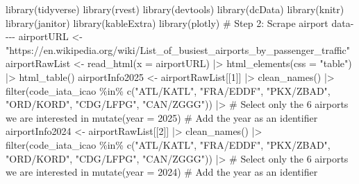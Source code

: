 \documentclass[
  letterpaper,
  DIV=11,
  numbers=noendperiod]{scrartcl}
\newenvironment{Shaded}{\begin{snugshade}}{\end{snugshade}}
\newcommand{\AttributeTok}[1]{\textcolor[rgb]{0.40,0.45,0.13}{#1}}
\newcommand{\CommentTok}[1]{\textcolor[rgb]{0.37,0.37,0.37}{#1}}
\newcommand{\DecValTok}[1]{\textcolor[rgb]{0.68,0.00,0.00}{#1}}
\newcommand{\FunctionTok}[1]{\textcolor[rgb]{0.28,0.35,0.67}{#1}}
\newcommand{\NormalTok}[1]{\textcolor[rgb]{0.00,0.23,0.31}{#1}}
\newcommand{\OtherTok}[1]{\textcolor[rgb]{0.00,0.23,0.31}{#1}}
\newcommand{\SpecialCharTok}[1]{\textcolor[rgb]{0.37,0.37,0.37}{#1}}
\newcommand{\StringTok}[1]{\textcolor[rgb]{0.13,0.47,0.30}{#1}}
\begin{document}
\begin{Shaded}
\begin{Highlighting}[]
\FunctionTok{library}\NormalTok{(tidyverse)}
\FunctionTok{library}\NormalTok{(rvest)}
\FunctionTok{library}\NormalTok{(devtools)}
\FunctionTok{library}\NormalTok{(dcData)}
\FunctionTok{library}\NormalTok{(knitr)}
\FunctionTok{library}\NormalTok{(janitor)}
\FunctionTok{library}\NormalTok{(kableExtra)}
\FunctionTok{library}\NormalTok{(plotly)}
\CommentTok{\# Step 2: Scrape airport data{-}{-}{-}{-}}
\NormalTok{airportURL }\OtherTok{\textless{}{-}} \StringTok{"https://en.wikipedia.org/wiki/List\_of\_busiest\_airports\_by\_passenger\_traffic"}
\NormalTok{airportRawList }\OtherTok{\textless{}{-}} \FunctionTok{read\_html}\NormalTok{(}\AttributeTok{x =}\NormalTok{ airportURL) }\SpecialCharTok{|\textgreater{}}
  \FunctionTok{html\_elements}\NormalTok{(}\AttributeTok{css =} \StringTok{"table"}\NormalTok{) }\SpecialCharTok{|\textgreater{}}
  \FunctionTok{html\_table}\NormalTok{() }
\NormalTok{airportInfo2025 }\OtherTok{\textless{}{-}}\NormalTok{ airportRawList[[}\DecValTok{1}\NormalTok{]] }\SpecialCharTok{|\textgreater{}} 
  \FunctionTok{clean\_names}\NormalTok{() }\SpecialCharTok{|\textgreater{}}
  \FunctionTok{filter}\NormalTok{(}\StringTok{\textasciigrave{}}\AttributeTok{code\_iata\_icao}\StringTok{\textasciigrave{}} \SpecialCharTok{\%in\%} \FunctionTok{c}\NormalTok{(}\StringTok{"ATL/KATL"}\NormalTok{, }\StringTok{"FRA/EDDF"}\NormalTok{, }\StringTok{"PKX/ZBAD"}\NormalTok{,}
                                 \StringTok{"ORD/KORD"}\NormalTok{, }\StringTok{"CDG/LFPG"}\NormalTok{, }\StringTok{"CAN/ZGGG"}\NormalTok{)) }\SpecialCharTok{|\textgreater{}} 
  \CommentTok{\# Select only the 6 airports we are interested in}
  \FunctionTok{mutate}\NormalTok{(}\AttributeTok{year =} \DecValTok{2025}\NormalTok{) }\CommentTok{\# Add the year as an identifier}
\NormalTok{airportInfo2024 }\OtherTok{\textless{}{-}}\NormalTok{ airportRawList[[}\DecValTok{2}\NormalTok{]] }\SpecialCharTok{|\textgreater{}}
  \FunctionTok{clean\_names}\NormalTok{() }\SpecialCharTok{|\textgreater{}}
  \FunctionTok{filter}\NormalTok{(}\StringTok{\textasciigrave{}}\AttributeTok{code\_iata\_icao}\StringTok{\textasciigrave{}} \SpecialCharTok{\%in\%} \FunctionTok{c}\NormalTok{(}\StringTok{"ATL/KATL"}\NormalTok{, }\StringTok{"FRA/EDDF"}\NormalTok{, }\StringTok{"PKX/ZBAD"}\NormalTok{, }
                                 \StringTok{"ORD/KORD"}\NormalTok{, }\StringTok{"CDG/LFPG"}\NormalTok{, }\StringTok{"CAN/ZGGG"}\NormalTok{)) }\SpecialCharTok{|\textgreater{}} 
  \CommentTok{\# Select only the 6 airports we are interested in}
  \FunctionTok{mutate}\NormalTok{(}\AttributeTok{year =} \DecValTok{2024}\NormalTok{) }\CommentTok{\# Add the year as an identifier}

\end{Highlighting}
\end{Shaded}
\end{document}
